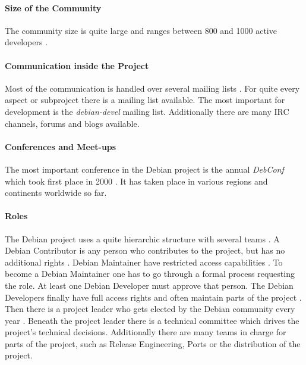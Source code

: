 \paragraph{Size of the Community}

The community size is quite large and ranges between 800 and 1000 active
developers \cite{Perrier2011,DebianOrg}.

\paragraph{Communication inside the Project}

Most of the communication is handled over several mailing lists
\cite{DebianMailingLists,DebianFAQ,DebianNewMembers}. For quite every aspect or
subproject there is a mailing list available. The most important for
development is the \emph{debian-devel} mailing list. Additionally there are
many \ac{IRC} channels, forums and blogs available.

\paragraph{Conferences and Meet-ups}

The most important conference in the Debian project is the annual
\emph{DebConf} which took first place in 2000 \cite{DebianDebConf}. It has
taken place in various regions and continents worldwide so far.

\paragraph{Roles}

The Debian project uses a quite hierarchic structure with several teams
\cite{DebianOrg,Sadowski2008}. A Debian Contributor is any person who
contributes to the project, but has no additional rights \cite{DebianFAQ}.
Debian Maintainer have restricted access capabilities \cite{DebianMaintainer}.
To become a Debian Maintainer one has to go through a formal process requesting
the role. At least one Debian Developer must approve that person. The Debian
Developers finally have full access rights and often maintain parts of the
project \cite{DebianDev}. Then there is a project leader who gets elected by
the Debian community every year \cite{DebianOrg,DebianVoting}. Beneath the
project leader there is a technical committee which drives the project's
technical decisions. Additionally there are many teams in charge for parts of
the project, such as Release Engineering, Ports or the distribution of the
project.

